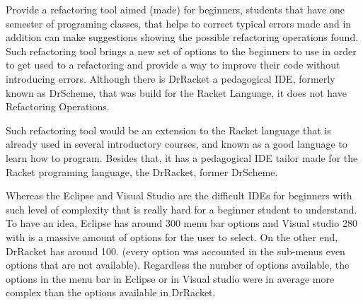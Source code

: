 Provide a refactoring tool aimed (made) for beginners, students that have one semester
of programing classes, that helps to correct typical errors made and in addition can
make suggestions showing the possible refactoring operations found.
Such refactoring tool brings a new set of options to the beginners to use
in order to get used to a refactoring and provide a way to improve their code
without introducing errors.
Although there is DrRacket a pedagogical IDE, formerly known as DrScheme, that was
build for the Racket Language, it does not have Refactoring Operations.

Such refactoring tool would be an extension to the Racket language that is already
used in several introductory courses,
and known as a good language to learn how to program.
Besides that, it has a pedagogical IDE tailor made for the Racket programing language,
the DrRacket, former DrScheme. %



Whereas the Eclipse and Visual Studio are the difficult IDEs for beginners with such level of
complexity that is really hard for a beginner student to understand.
To have an idea, Eclipse has around 300 menu bar options and Visual studio 280 with is a massive amount
of options for the user to select. On the other end, DrRacket has around 100. (every option was accounted in the sub-menus
even options that are not available). Regardless the number of options available,
the options in the menu bar in Eclipse or in Visual studio were in average more complex than the
options available in DrRacket.



